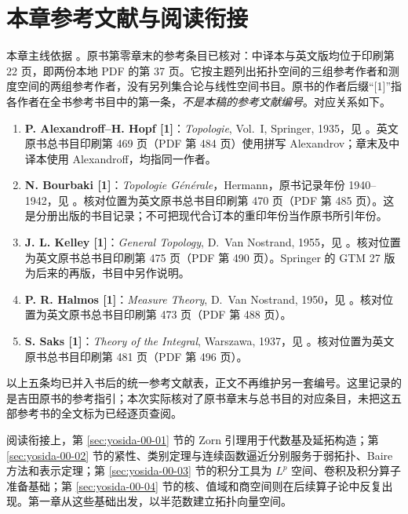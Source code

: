 \section*{本章参考文献与阅读衔接}
{}

本章主线依据 \cite{yosida-zh,yosida-en}。原书第零章末的参考条目已核对：中译本与英文版均位于印刷第 22 页，即两份本地 PDF 的第 37 页。它按主题列出拓扑空间的三组参考作者和测度空间的两组参考作者，没有另列集合论与线性空间书目。原书的作者后缀“[1]”指各作者在全书参考书目中的第一条，\emph{不是本稿的参考文献编号}。对应关系如下。

\begin{enumerate}
 \item \textbf{P. Alexandroff--H. Hopf [1]}：\emph{Topologie}, Vol.~I, Springer, 1935，见 \cite{alexandroff-hopf}。英文原书总书目印刷第 469 页（PDF 第 484 页）使用拼写 Alexandrov；章末及中译本使用 Alexandroff，均指同一作者。
 \item \textbf{N. Bourbaki [1]}：\emph{Topologie G\'en\'erale}，Hermann，原书记录年份 1940--1942，见 \cite{bourbaki-topology}。核对位置为英文原书总书目印刷第 470 页（PDF 第 485 页）。这是分册出版的书目记录；不可把现代合订本的重印年份当作原书所引年份。
 \item \textbf{J. L. Kelley [1]}：\emph{General Topology}, D.~Van Nostrand, 1955，见 \cite{kelley-topology}。核对位置为英文原书总书目印刷第 475 页（PDF 第 490 页）。Springer 的 GTM 27 版为后来的再版，书目中另作说明。
 \item \textbf{P. R. Halmos [1]}：\emph{Measure Theory}, D.~Van Nostrand, 1950，见 \cite{halmos-measure}。核对位置为英文原书总书目印刷第 473 页（PDF 第 488 页）。
 \item \textbf{S. Saks [1]}：\emph{Theory of the Integral}, Warszawa, 1937，见 \cite{saks-integral}。核对位置为英文原书总书目印刷第 481 页（PDF 第 496 页）。
\end{enumerate}

以上五条均已并入书后的统一参考文献表，正文不再维护另一套编号。这里记录的是吉田原书的参考指引；本次实际核对了原书章末与总书目的对应条目，未把这五部参考书的全文标为已经逐页查阅。

阅读衔接上，第 \ref{sec:yosida-00-01} 节的 Zorn 引理用于代数基及延拓构造；第 \ref{sec:yosida-00-02} 节的紧性、类别定理与连续函数逼近分别服务于弱拓扑、Baire 方法和表示定理；第 \ref{sec:yosida-00-03} 节的积分工具为 $L^p$ 空间、卷积及积分算子准备基础；第 \ref{sec:yosida-00-04} 节的核、值域和商空间则在后续算子论中反复出现。第一章从这些基础出发，以半范数建立拓扑向量空间。
